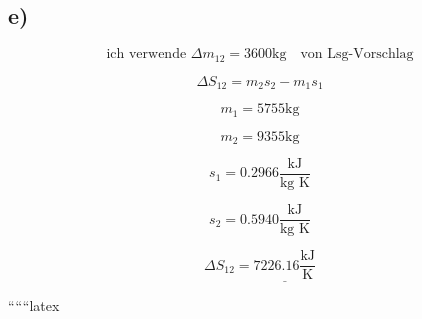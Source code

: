 

\subsection*{e)}

\[
\text{ich verwende } \Delta m_{12} = 3600 \text{kg} \quad \text{von Lsg-Vorschlag}
\]

\[
\Delta S_{12} = m_2 s_2 - m_1 s_1
\]

\[
m_1 = 5755 \text{kg}
\]

\[
m_2 = 9355 \text{kg}
\]

\[
s_1 = 0.2966 \frac{\text{kJ}}{\text{kg K}}
\]

\[
s_2 = 0.5940 \frac{\text{kJ}}{\text{kg K}}
\]

\[
\Delta S_{12} = \underline{7226.16 \frac{\text{kJ}}{\text{K}}}
\]

``````latex